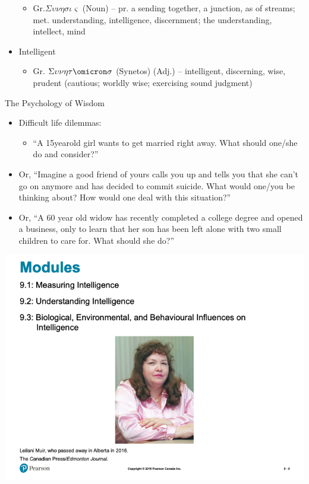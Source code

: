 \documentclass[
]{book}
\providecommand{\tightlist}{%
  \setlength{\itemsep}{0pt}\setlength{\parskip}{0pt}}
\begin{document}
\begin{reflect}
\begin{itemize}
  \begin{itemize}
  \tightlist
  \item
    Gr.\(\Sigma\upsilon\nu\eta\sigma\iota\varsigma\) (Noun) -- pr. a sending together, a junction, as of streams; met. understanding, intelligence, discernment; the understanding, intellect, mind\\
  \end{itemize}
\item
  Intelligent

  \begin{itemize}
  \tightlist
  \item
    Gr. \(\Sigma\upsilon\nu\eta\tau\omicron\sigma\) (Synetos) (Adj.) -- intelligent, discerning, wise, prudent (cautious; worldly wise; exercising sound judgment)
  \end{itemize}
\end{itemize}

The Psychology of Wisdom

\begin{itemize}
\tightlist
\item
  Difficult life dilemmas:

  \begin{itemize}
  \tightlist
  \item
    ``A 15yearold girl wants to get married right away. What should one/she do and consider?''
  \end{itemize}
\item
  Or, ``Imagine a good friend of yours calls you up and tells you that she can't go on anymore and has decided to commit suicide. What would one/you be thinking about? How would one deal with this situation?''\\
\item
  Or, ``A 60 year old widow has recently completed a college degree and opened a business, only to learn that her son has been left alone with two small children to care for. What should she do?''
\end{itemize}

\includegraphics{assets/unit_2/slide_9.png}


\end{reflect}
\end{document}
